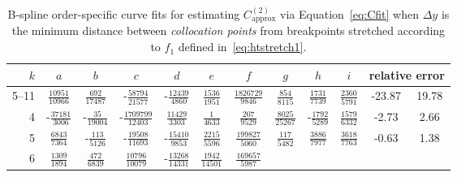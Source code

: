 \begin{sidewaystable}
\centering
\caption[
    B-spline order-specific curve fits for $C_\text{approx}^{(2)}$
    for stretching~\eqref{eq:htstretch1}.
]{%
    B-spline order-specific curve fits for estimating $C_\text{approx}^{(2)}$
    via Equation~\eqref{eq:Cfit} when $\Delta{}y$ is the minimum distance
    between \emph{collocation points} from breakpoints stretched according to
    $f_1$ defined in~\eqref{eq:htstretch1}.
}
\label{tab:C2fit1}
\vspace{1em}
\renewcommand{\arraystretch}{1.40}   %
\begin{tabular}{r|ccccccccc|c@{ -- }c@{\%}}
 $k$ & $a$ & $b$ & $c$ & $d$ & $e$ & $f$ & $g$ & $h$ & $i$
     & \multicolumn{2}{c}{relative error}
\\ \hline
5--11
&  $\frac{           10951}{           10966}$
&  $\frac{             692}{           17487}$
& -$\frac{           58794}{           21577}$
& -$\frac{           12439}{            4860}$
&  $\frac{            1536}{            1951}$
&  $\frac{         1826729}{            9846}$
&  $\frac{             854}{            8115}$
&  $\frac{            1731}{            7739}$
&  $\frac{            2360}{            5791}$
&  -23.87 &  19.78
\\
4
& -$\frac{           37181}{            3006}$
& -$\frac{              35}{           19004}$
& -$\frac{         1709799}{           12403}$
&  $\frac{           11429}{            3303}$
&  $\frac{               1}{            4633}$
&  $\frac{             207}{            9529}$
&  $\frac{            8025}{           25267}$
& -$\frac{            1792}{            5289}$
&  $\frac{            1579}{            6332}$
&  -2.73 &  2.66
\\
5
&  $\frac{            6843}{            7364}$
& -$\frac{             113}{            5126}$
& -$\frac{           19508}{           11693}$
& -$\frac{           15410}{            9853}$
&  $\frac{            2215}{            5596}$
&  $\frac{          199827}{            5060}$
&  $\frac{             117}{            5482}$
&  $\frac{            3886}{            7977}$
&  $\frac{            3618}{            7763}$
&  -0.63 &  1.38
\\
6
&  $\frac{            1309}{            1894}$
&  $\frac{             472}{            6839}$
&  $\frac{           10796}{           10079}$
& -$\frac{           13268}{           14331}$
&  $\frac{            1942}{           14501}$
&  $\frac{          169657}{            5987}$

\end{tabular}
\end{sidewaystable}
